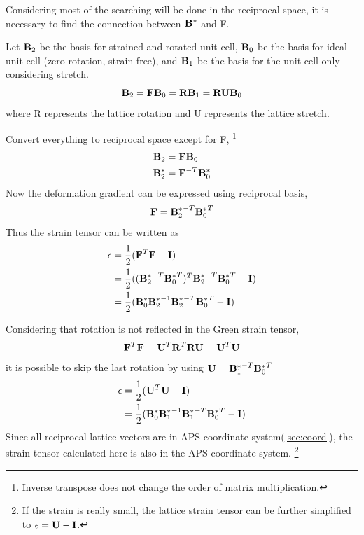 \documentclass[12pt]{scrartcl}
\begin{document}
\begin{enumerate}
Considering most of the searching will be done in the reciprocal space, it is necessary to find the connection between $\mathbf{B}^*$ and \tnsr F.

Let $\mathbf{B}_2$ be the basis for strained and rotated unit cell, $\mathbf{B}_0$ be the basis for ideal unit cell (zero rotation, strain free), and $\mathbf{B}_1$ be the basis for the unit cell only considering stretch.
\[
	\mathbf{B}_2 = \mathbf{F} \mathbf{B}_0 = \mathbf{R} \mathbf{B}_1 = \mathbf{R} \mathbf{U} \mathbf{B}_0
\]
where \tnsr R represents the lattice rotation and \tnsr U represents the lattice stretch.

Convert everything to reciprocal space except for \tnsr F,
\footnote{Inverse transpose does not change the order of matrix multiplication.}
\begin{align*}
	\mathbf{B}_2 &= \mathbf{F} \mathbf{B}_0 \\
	\mathbf{B}^*_2 &= \mathbf{F}^{-T} \mathbf{B}_0^*
\end{align*}
Now the deformation gradient can be expressed using reciprocal basis,
\[
	\mathbf{F} = {\mathbf{B}_2^*}^{-T} {\mathbf{B}_0^*}^T
\]
Thus the strain tensor can be written as
\begin{align*}
	\epsilon &= \dfrac{1}{2} (\mathbf{F}^T\mathbf{F} - \mathbf{I}) \\
	              &= \dfrac{1}{2} ( ({\mathbf{B}_2^*}^{-T} {\mathbf{B}_0^*}^T)^T{\mathbf{B}_2^*}^{-T} {\mathbf{B}_0^*}^T - \mathbf{I}) \\
	              &= \dfrac{1}{2} ( \mathbf{B}_0^* {\mathbf{B}_2^*}^{-1} {\mathbf{B}_2^*}^{-T} {\mathbf{B}_0^*}^T  - \mathbf{I})
\end{align*}

Considering that rotation is not reflected in the Green strain tensor,
\[
	\mathbf{F}^T \mathbf{F} = \mathbf{U}^T \mathbf{R}^T \mathbf{R} \mathbf{U} = \mathbf{U}^T \mathbf{U}
\]
it is possible to skip the last rotation by using $\mathbf{U} =  {\mathbf{B}_1^*}^{-T} {\mathbf{B}_0^*}^T$
\begin{align*}
	\epsilon &=  \dfrac{1}{2} (\mathbf{U}^T\mathbf{U} - \mathbf{I}) \\
	              &=  \dfrac{1}{2} ( \mathbf{B}_0^* {\mathbf{B}_1^*}^{-1} {\mathbf{B}_1^*}^{-T} {\mathbf{B}_0^*}^T  - \mathbf{I})
\end{align*}
Since all reciprocal lattice vectors are in APS coordinate system(\cref{sec:coord}), the strain tensor calculated here is also in the APS coordinate system.
\footnote{If the strain is really small, the lattice strain tensor can be further simplified to $\epsilon = \mathbf{U} - \mathbf{I}$.} 


\end{enumerate}
\end{document}

